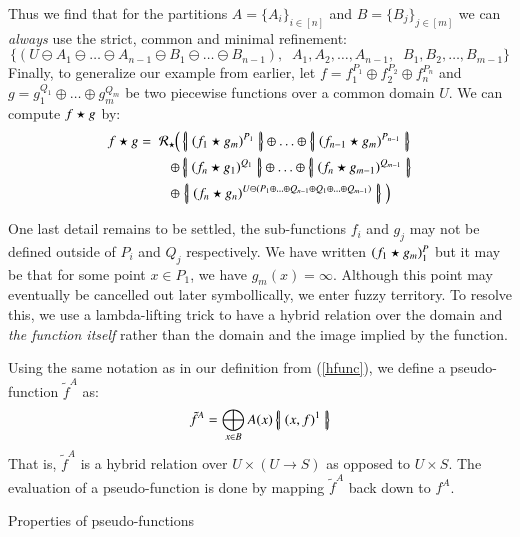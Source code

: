 Thus we find that for the partitions $A = \{ A_i \}_{i \in [n]}$ and $B = \{ B_j \}_{j \in [m]}$ we can \emph{always}
use the strict, common and minimal refinement:
\begin{equation}
	\Big\{ (U \ominus A_1 \ominus \ldots \ominus A_{n-1} \ominus B_1 \ominus \ldots \ominus B_{n-1}), \;\;
	A_1, A_2, \ldots, A_{n-1}, \;\; B_1, B_2, \ldots, B_{m-1}
	\Big\}
\end{equation}
Finally, to generalize our example from earlier, let $f = f_1^{P_1} \oplus f_2^{P_2} \oplus f_n^{P_n}$
and  $g = g_1^{Q_1} \oplus \ldots \oplus g_m^{Q_m}$ be two piecewise functions over a common domain $U$.
We can compute $f \star g$ by:
\begin{align}
f \op g = \; \mathcal{R}_\op  \; & \!\!\! \left( \,
		\hset{ (f_1 \op g_m)^{P_1} } 
		\oplus \ldots \oplus 
		\hset{ (f_{n-1} \op g_m)^{P_{n-1}}} \right. \notag \\
	\oplus & 
		\hset{ (f_n \op g_1)^{Q_1} } 
		\oplus \ldots \oplus 
		\hset{ (f_n \op g_{m-1})^{Q_{m-1}}} \notag \\
	\oplus & \left. 
		\hset{ (f_n \op g_n)^{
			U \ominus (P_1 \oplus \ldots \oplus Q_{n-1} \oplus Q_1 \oplus \ldots \oplus Q_{m-1})}
		}
	\; \right)
\end{align}


One last detail remains to be settled, the sub-functions $f_i$ and $g_j$ may not be defined outside of 
$P_i$ and $Q_j$ respectively.
We have written $(f_1 \star g_m)^P_1$ but it may be that for some point $x \in P_1$, we have $g_m(x) = \infty$.
Although this point may eventually be cancelled out later symbollically, we enter fuzzy territory.
To resolve this, we use a lambda-lifting trick to have a hybrid relation over the domain and \emph{the function itself}
rather than the domain and the image implied by the function.


\begin{definition}
	Using the same notation as in our definition from (\ref{hfunc}), we define a pseudo-function $\tilde{f}^A$ as:
	\begin{equation}
 		\tilde{f}^A = \bigoplus_{x \in B} A(x) \left\{ \! \left| \; (x,f)^1 \; \right| \! \right\}
	\end{equation}
	That is, $\tilde{f}^A$ is a hybrid relation over $U \times (U \to S)$ as opposed to $U \times S$.
	The evaluation of a pseudo-function is done by mapping $\tilde{f}^A$ back down to $f^A$.
\end{definition}

Properties of pseudo-functions


